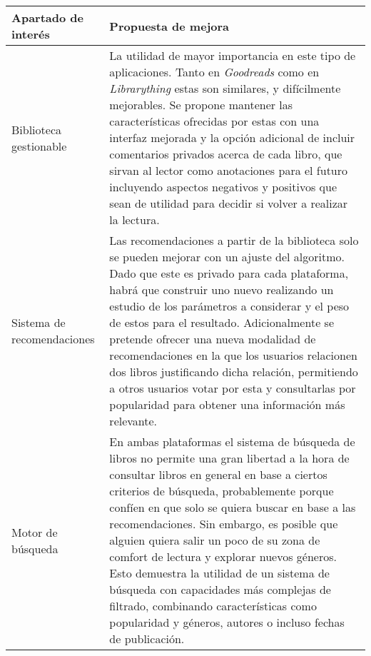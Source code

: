 \begin{table}[H]
    \begin{tabularx}{\linewidth}{|X|X|}
        \hline
        \textbf{Apartado de interés} & \textbf{Propuesta de mejora} \\
        \hline
        Biblioteca gestionable     & La utilidad de mayor importancia en este tipo de aplicaciones. Tanto en \textit{Goodreads} como en \textit{Librarything} estas son similares, y difícilmente mejorables. Se propone mantener las características ofrecidas por estas con una interfaz mejorada y la opción adicional de incluir comentarios privados acerca de cada libro, que sirvan al lector como anotaciones para el futuro incluyendo aspectos negativos y positivos que sean de utilidad para decidir si volver a realizar la lectura. \\ 
        \hline
        Sistema de recomendaciones & Las recomendaciones a partir de la biblioteca solo se pueden mejorar con un ajuste del algoritmo. Dado que este es privado para cada plataforma, habrá que construir uno nuevo realizando un estudio de los parámetros a considerar y el peso de estos para el resultado. Adicionalmente se pretende ofrecer una nueva modalidad de recomendaciones en la que los usuarios relacionen dos libros justificando dicha relación, permitiendo a otros usuarios votar por esta y consultarlas por popularidad para obtener una información más relevante. \\ 
        \hline
        Motor de búsqueda   & En ambas plataformas el sistema de búsqueda de libros no permite una gran libertad a la hora de consultar libros en general en base a ciertos criterios de búsqueda, probablemente porque confíen en que solo se quiera buscar en base a las recomendaciones. Sin embargo, es posible que alguien quiera salir un poco de su zona de comfort de lectura y explorar nuevos géneros. Esto demuestra la utilidad de un sistema de búsqueda con capacidades más complejas de filtrado, combinando características como popularidad y géneros, autores o incluso fechas de publicación. \\ 
        \hline
    \end{tabularx}
\end{table}